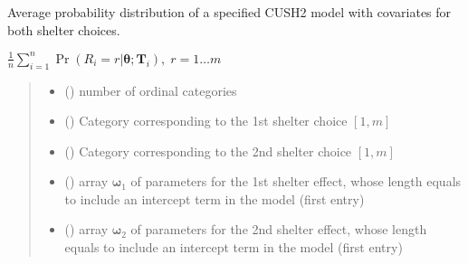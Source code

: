 \documentclass[letterpaper,10pt,english]{sphinxmanual}
\begin{document}
\begin{fulllineitems}
\label{\detokenize{cubmods:cubmods.cush2_xx.pmf}}
\pysigstartsignatures
{}
\pysigstopsignatures
\sphinxAtStartPar
Average probability distribution of a specified CUSH2 model with covariates
for both shelter choices.

\sphinxAtStartPar
\(\frac{1}{n} \sum_{i=1}^n \Pr(R_i=r|\pmb\theta; \pmb T_i),\; r=1 \ldots m\)
\begin{quote}\begin{description}
\begin{itemize}
\item {} 
\sphinxAtStartPar
{} () \textendash{} number of ordinal categories

\item {} 
\sphinxAtStartPar
{} () \textendash{} Category corresponding to the 1st shelter choice \([1,m]\)

\item {} 
\sphinxAtStartPar
{} () \textendash{} Category corresponding to the 2nd shelter choice \([1,m]\)

\item {} 
\sphinxAtStartPar
{} () \textendash{} array \(\pmb \omega_1\) of parameters for the 1st shelter effect, whose length equals 
 to include an intercept term in the model (first entry)

\item {} 
\sphinxAtStartPar
{} () \textendash{} array \(\pmb \omega_2\) of parameters for the 2nd shelter effect, whose length equals 
 to include an intercept term in the model (first entry)


\end{itemize}
\end{description}
\end{quote}
\end{fulllineitems}
\end{document}
